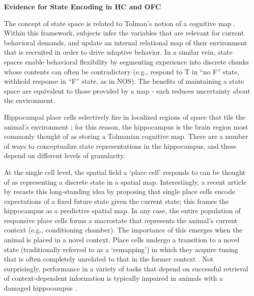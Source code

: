 \documentclass[11pt]{article}
\let\cite=\citep
\let\citeN=\citet
\begin{document}
{\bf Evidence for State Encoding in HC and OFC} 

The concept of state space is related to Tolman's notion of a cognitive map 
\cite{Tolman1948}. Within this framework, subjects infer the variables that are 
relevant for current behavioral demands, and update an internal relational map 
of their environment that is recruited in order to drive adaptive behavior. In 
a similar vein, state spaces enable behavioral flexibility by segmenting 
experience into discrete chunks whose contents can often be contradictory 
(e.g., respond to T in ``no F'' state, withhold response in ``F'' state, as in 
NOS). The benefits of maintaining a state space are equivalent to those 
provided by a map - each reduces uncertainty about the environment. 

Hippocampal place cells selectively fire in localized regions of space that 
tile the animal's environment \cite{OKeefe1971,OKeefe1978}; for this reason, 
the hippocampus is the brain region most commonly thought of as storing a 
Tolmanian cognitive map. There are a number of ways to conceptualize state 
representations in the hippocampus, and these depend on different levels of 
granularity. 

At the single cell level, the spatial field a `place cell' responds to can be 
thought of as representing a discrete state in a spatial map. Interestingly, a 
recent article by \citeN{Stachenfeld2017} recasts this long-standing idea by 
proposing that single place cells encode expectations of a fixed future state 
given the current state; this frames the hippocampus as a predictive spatial 
map. In any case, the entire population of responsive place cells forms a 
macrostate that represents the animal's current context (e.g., conditioning 
chamber). The importance of this emerges when the animal is placed in a novel 
context. Place cells undergo a transition to a novel state (traditionally 
referred to as a `remapping') in which they acquire tuning that is often 
completely unrelated to that in the former context 
\cite{Muller1987,Muller1996}. Not surprisingly, performance in a variety of 
tasks that depend on successful retrieval of context-dependent information is 
typically impaired in animals with a damaged hippocampus 
\cite{Honey1993,Holt1999,Gilbert2001,Corcoran2004,Maren2013,Xu2016}. 
\end{document}
